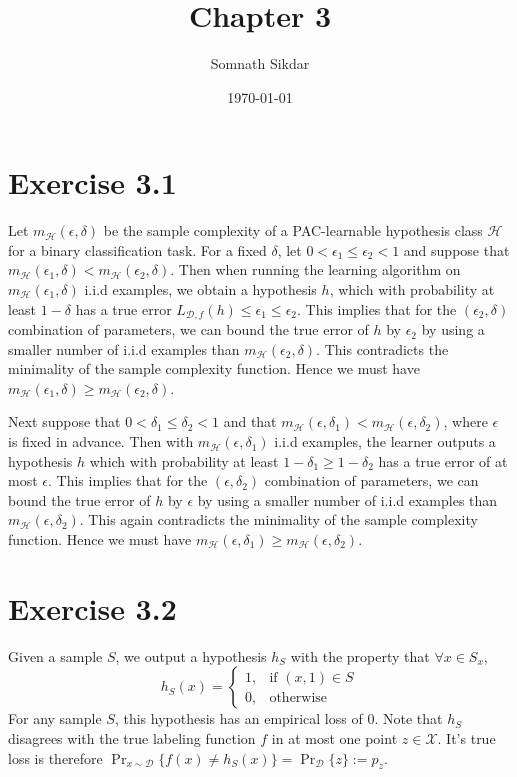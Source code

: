 \documentclass[11pt]{article}
\title{Chapter 3}
\author{Somnath Sikdar}
\date{\today}
\theoremstyle{definition}
\newcommand{\samplecomp}[2]{m_{\mathcal{H}}(#1, #2)}
\newcommand{\pacerror}[1]{L_{\mathcal{D}, f}(#1)}
\begin{document}
\maketitle

\section*{Exercise 3.1}

Let $\samplecomp{\epsilon}{\delta}$ be the sample complexity of a PAC-learnable hypothesis class 
$\mathcal{H}$ for a binary classification task. For a fixed $\delta$, let 
$0 < \epsilon_1 \leq \epsilon_2 < 1$ and suppose that 
$\samplecomp{\epsilon_1}{\delta} < \samplecomp{\epsilon_2}{\delta}$. Then when 
running the learning algorithm on $\samplecomp{\epsilon_1}{\delta}$ i.i.d examples, 
we obtain a hypothesis $h$, which with probability at least $1 - \delta$ has 
a true error $\pacerror{h} \leq \epsilon_1 \leq \epsilon_2$. This
implies that for the $(\epsilon_2, \delta)$ combination of parameters, we can bound 
the true error of $h$ by $\epsilon_2$ by using a smaller number of i.i.d examples 
than $\samplecomp{\epsilon_2}{\delta}$. This contradicts
the minimality of the sample complexity function. Hence we must have 
$\samplecomp{\epsilon_1}{\delta} \geq \samplecomp{\epsilon_2}{\delta}$.

Next suppose that $0 < \delta_1 \leq \delta_2 < 1$ and that 
$\samplecomp{\epsilon}{\delta_1} < \samplecomp{\epsilon}{\delta_2}$, where $\epsilon$
is fixed in advance. Then with $\samplecomp{\epsilon}{\delta_1}$ i.i.d examples, the
learner outputs a hypothesis $h$ which with probability at least 
$1 - \delta_1 \geq 1 - \delta_2$ has a true error of at most $\epsilon$. This
implies that for the $(\epsilon, \delta_2)$ combination of parameters, we can bound 
the true error of $h$ by $\epsilon$ by using a smaller number of i.i.d examples 
than $\samplecomp{\epsilon}{\delta_2}$. This again contradicts
the minimality of the sample complexity function. Hence we must have 
$\samplecomp{\epsilon}{\delta_1} \geq \samplecomp{\epsilon}{\delta_2}$.

\section*{Exercise 3.2}

Given a sample $S$, we output a hypothesis $h_S$ with the property that 
$\forall x \in S_x$, 
\[
    h_S(x) = \left \{ \begin{array}{rl} 
                            1, & \text{if $(x, 1) \in S$} \\
                            0, & \text{otherwise}
                      \end{array} \right .
\]
For any sample $S$, this hypothesis has an empirical loss of $0$. Note 
that $h_S$ disagrees with the true labeling function $f$ in at most one point 
$z \in \mathcal{X}$. It's true loss is therefore 
$\Pr_{x \sim \mathcal{D}} \{ f(x) \neq h_S(x)\} = \Pr_{\mathcal{D}} \{z\} := p_z$. 
\end{document}
